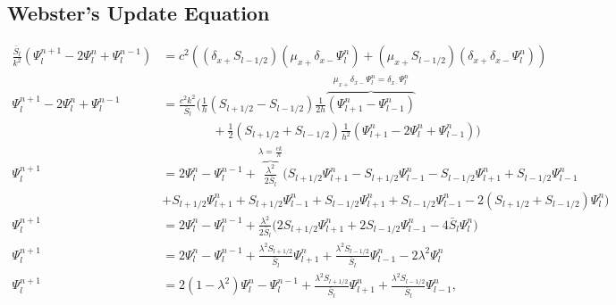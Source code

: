 \documentclass[dvipsnames]{article}
\def\dxp{\delta_{x+}}
\def\dxm{\delta_{x-}}
\def\mup{\mu_{x+}}
\def\Sp{S_{l+1/2}}
\def\Sm{S_{l-1/2}}
\def\Psilp{\Psi_{l+1}^n}
\def\Psilm{\Psi_{l-1}^n}
\def\Psinp{\Psi_l^{n+1}}
\def\Psinm{\Psi_l^{n-1}}
\def\Psiln{\Psi_l^n}
\def\Sbar{\bar S_l}
\begin{document}
\subsection{Webster's Update Equation}\label{app:webstersUpdateEq}

\begin{align}
    \frac{\Sbar}{k^2}(\Psinp - 2\Psiln+\Psinm) &= c^2\left((\dxp \Sm)(\mup \dxm \Psiln) + (\mup \Sm)(\dxp \dxm \Psiln)\right)\nonumber\\
    \Psinp - 2\Psiln+\Psinm &= \frac{c^2k^2}{\Sbar}\bigg(\frac{1}{h}(\Sp - \Sm)\frac{1}{2h}\overbrace{(\Psilp -\Psilm)}^{\mup\dxm\Psiln = \delta_{x\cdot}\Psiln}\nonumber\\
    &\qquad\qquad+\frac{1}{2}(\Sp + \Sm)\frac{1}{h^2}(\Psilp-2\Psiln+\Psilm)\bigg)\nonumber\\
    \Psinp &= 2\Psiln-\Psinm + \overbrace{\frac{\lambda^2}{2\Sbar}}^{\lambda = \frac{ck}{h}}\Big(\Sp\Psilp - \Sp\Psilm - \Sm\Psilp + \Sm\Psilm \nonumber\\
    &+ \Sp\Psilp + \Sp\Psilm + \Sm\Psilp + \Sm\Psilm - 2 (\Sp + \Sm)\Psiln\Big)\nonumber\\
    \Psinp &= 2\Psiln-\Psinm+ \frac{\lambda^2}{2\Sbar}\Big(2\Sp\Psilp + 2\Sm\Psilm - 4\Sbar\Psiln\Big)\nonumber\\
    \Psinp &= 2\Psiln-\Psinm+ \frac{\lambda^2\Sp}{\Sbar}\Psilp + \frac{\lambda^2\Sm}{\Sbar}\Psilm - 2\lambda^2\Psiln\nonumber\\
    \Psinp &= 2(1-\lambda^2)\Psiln-\Psinm+ \frac{\lambda^2\Sp}{\Sbar}\Psilp + \frac{\lambda^2\Sm}{\Sbar}\Psilm,
\end{align}
\end{document}
